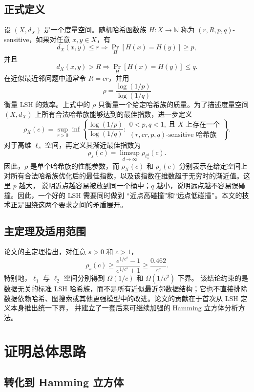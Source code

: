 \documentclass[UTF8,11pt,a4paper]{ctexart}
\newcommand{\N}{\mathbb{N}}
\newcommand{\Prb}{\operatorname{Pr}}
\begin{document}
\subsection{正式定义}

设 $(X,d_X)$ 是一个度量空间。随机哈希函数族 $H:X\to\N$ 称为
$(r,R,p,q)$-sensitive，如果对任意 $x,y\in X$，有
\[
  d_X(x,y)\le r
  \Rightarrow
  \Prb_H[H(x)=H(y)]\ge p,
\]
并且
\[
  d_X(x,y)>R
  \Rightarrow
  \Prb_H[H(x)=H(y)]\le q.
\]
在近似最近邻问题中通常令 $R=cr$，并用
\[
  \rho=\frac{\log(1/p)}{\log(1/q)}
\]
衡量 LSH 的效率。上式中的 $\rho$ 只衡量一个给定哈希族的质量。为了描述度量空间
$(X,d_X)$ 上所有合法哈希族能够达到的最佳指数，进一步定义
\[
  \rho_X(c)
  =
  \sup_{r>0}
  \inf\left\{
    \frac{\log(1/p)}{\log(1/q)}:
    \begin{array}{l}
      0<p,q<1,\ \text{且 }X\text{ 上存在一个}\\[-0.2em]
      (r,cr,p,q)\text{-sensitive 哈希族}
    \end{array}
  \right\}.
\]
对于高维 $\ell_s$ 空间，再定义其渐近最佳指数为
\[
  \rho_s(c)
  =
  \limsup_{d\to\infty}\rho_{\ell_s^d}(c).
\]
因此，$\rho$ 是单个哈希族的性能参数，而 $\rho_X(c)$ 和 $\rho_s(c)$ 分别表示在给定空间上
对所有合法哈希族优化后的最佳指数，以及该指数在维数趋于无穷时的渐近值。这里 $p$ 越大，
说明近点越容易被放到同一个桶中；$q$ 越小，说明远点越不容易误碰撞。因此，一个好的 LSH 需要同时做到
“近点高碰撞”和“远点低碰撞”。本文的技术正是围绕这两个要求之间的矛盾展开。

\subsection{主定理及适用范围}

论文的主定理指出，对任意 $s>0$ 和 $c>1$，
\[
  \rho_s(c)
  \ge
  \frac{e^{1/c^s}-1}{e^{1/c^s}+1}
  \ge
  \frac{0.462}{c^s}.
\]
特别地，$\ell_1$ 与 $\ell_2$ 空间分别得到 $\Omega(1/c)$ 和 $\Omega(1/c^2)$ 下界。
该结论约束的是数据无关的标准 LSH 哈希族，而不是所有近似最近邻数据结构；它也不直接排除
数据依赖哈希、图搜索或其他更强模型中的改进。论文的贡献在于首次从 LSH 定义本身推出统一下界，
并建立了一套后来可继续加强的 Hamming 立方体分析方法。

\section{证明总体思路}

\subsection{转化到 Hamming 立方体}
\end{document}
